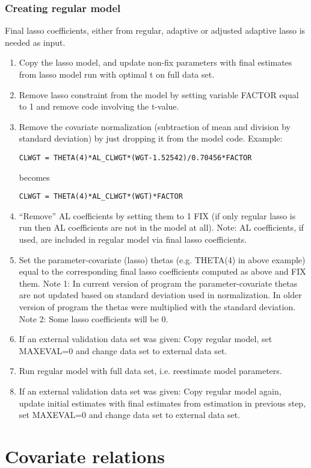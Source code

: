 \subsubsection*{Creating regular model}
Final lasso coefficients, either from regular, adaptive or adjusted adaptive lasso is needed as input. 
\begin{enumerate}
\item Copy the lasso model, and update non-fix parameters with final estimates from
lasso model run with optimal t on full data set.
\item Remove lasso constraint from the model by setting variable FACTOR equal to 1 and remove code involving
the t-value.
\item Remove the covariate normalization (subtraction of mean and division by standard deviation) by just dropping
it from the model code. Example:
\begin{verbatim}
CLWGT = THETA(4)*AL_CLWGT*(WGT-1.52542)/0.70456*FACTOR
\end{verbatim}
becomes
\begin{verbatim}
CLWGT = THETA(4)*AL_CLWGT*(WGT)*FACTOR
\end{verbatim}
\item ``Remove'' AL coefficients by setting them to 1 FIX (if only regular lasso is run then AL coefficients are not
in the model at all). Note: AL coefficients, if used, are included in regular model via final lasso coefficients.
\item Set the parameter-covariate (lasso) thetas
(e.g. THETA(4) in above example) equal to the corresponding final lasso coefficients
computed as above
and FIX them. Note 1: In current version of program
the parameter-covariate thetas are not updated based on standard deviation used in normalization. In older
version of program the thetas were multiplied with the standard deviation.
Note 2: Some lasso coefficients will be 0.
\item If an external validation data set was given: Copy regular model, set MAXEVAL=0 and change data set to
external data set.
\item Run regular model with full data set, i.e. reestimate model parameters.
\item If an external validation data set was given: Copy regular model again, update initial estimates
with final estimates from estimation in previous step, set MAXEVAL=0 and change data set to
external data set.
\end{enumerate}

\section{Covariate relations}
